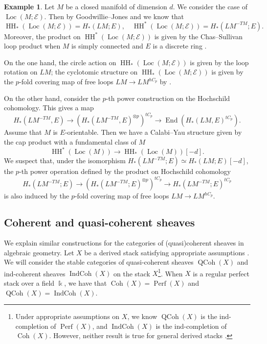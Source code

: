\documentclass[11pt]{amsart}
\numberwithin{equation}{section}
\theoremstyle{plain}
\theoremstyle{definition}
\newtheorem{eg}[Eg]{Example}
\theoremstyle{remark}
\newcommand{\cE} { {\mathcal{E}}}
\newcommand\End{\operatorname{End}}
\newcommand\HH{\operatorname{HH}}
\newcommand\Loc{ {\operatorname{Loc}} }
\newcommand\Coh{\operatorname{Coh}}
\newcommand\IndCoh{\operatorname{IndCoh}}
\newcommand\Perf{\operatorname{Perf}}
\newcommand\QCoh{\operatorname{QCoh}}
\begin{document}
\begin{eg}Let $M$ be a closed manifold of dimension $d$. We consider the case of $\Loc(M; \cE)$. Then by Goodwillie--Jones \cite{Jones1987,Goodwillie85} and \cite[Section 5.1]{Brav-Dyckerhoff1} we know that
\[\HH_*(\Loc(M; \cE)) = H_*(LM; E), \quad \HH^*(\Loc(M; \cE)) = H_*(LM^{-TM}; E).\]
Moreover, the product on $\HH^*(\Loc(M; \cE))$ is given by the Chas--Sullivan loop product \cite{Cohen_2002} when $M$ is simply connected and $E$ is a discrete ring \cite{felixThomas2009string}. 

On the one hand, the circle action on $\HH_*(\Loc(M; \cE))$ is given by the loop rotation on $LM$; the cyclotomic structure on $\HH_*(\Loc(M; \cE))$ is given by the $p$-fold covering map of free loops $LM \to LM^{hC_p}$ by \cite[Proposition IV.3.2]{Nikolaus-Scholze-Ontopologicalcyclichomology}.

On the other hand, consider the $p$-th power construction on the Hochschild cohomology. This gives a map
\[H_*(LM^{-TM}, E) \to (H_*(LM^{-TM}, E)^{\otimes p})^{tC_p} \to \End(H_*(LM, E)^{tC_p}).\]
Assume that $M$ is $E$-orientable. Then we have a Calabi--Yau structure given by the cap product with a fundamental class of $M$ \cite{Brav-Rozenblyum}
\[\HH^*(\Loc(M)) \rightarrow \HH_*(\Loc(M))[-d].\]
We suspect that, under the isomorphism $H_*(LM^{-TM}; E) \simeq H_*(LM; E)[-d]$, the $p$-th power operation defined by the product on Hochschild cohomology
\[H_*(LM^{-TM}; E) \to (H_*(LM^{-TM}; E)^{\otimes p})^{tC_p} \to H_*(LM^{-TM}; E)^{tC_p}\]
is also induced by the $p$-fold covering map of free loops $LM \to LM^{hC_p}$.
\end{eg}




\subsection{Coherent and quasi-coherent sheaves}
We explain similar constructions for the categories of (quasi)coherent sheaves in algebraic geometry. Let $X$ be a derived stack satisfying appropriate assumptions \cite{Ben-Zvi-Francis-Nadler,Drinfeld-Gaitsgory,Gaitsgory-Rozenblyum,Six-FunctorScholze,stefanich2025dualizability_deriveds_stack}. We will consider the stable categories of quasi-coherent sheaves $\QCoh(X)$ and ind-coherent sheaves $\IndCoh(X)$ on the stack $X$\footnote{Under appropriate assumptions on $X$, we know $\QCoh(X)$ is the ind-completion of $\Perf(X)$, and $\IndCoh(X)$ is the ind-completion of $\Coh(X)$. However, neither result is true for general derived stacks \cite[Section 1.1]{Ben-Zvi-Francis-Nadler} \cite[Theorem 0.3.4]{Drinfeld-Gaitsgory} \cite[Theorem 1.0.4]{stefanich2025dualizability_deriveds_stack}.}. When $X$ is a regular perfect stack over a field $\Bbbk$, we have that $\Coh(X) = \Perf(X)$ and $\QCoh(X) = \IndCoh(X)$.
\end{document}
